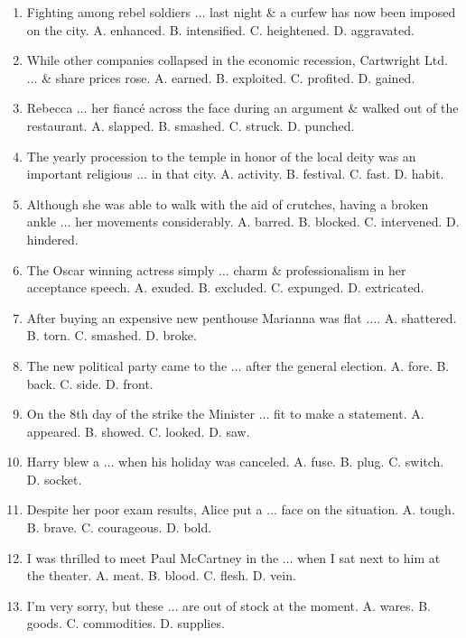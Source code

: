 \documentclass{article}
\numberwithin{equation}{section}
\begin{document}
\begin{enumerate}[leftmargin=8mm]
	\item Fighting among rebel soldiers $\ldots$ last night \& a curfew has now been imposed on the city. {\sf A.} enhanced. {\sf B.} intensified. {\sf C.} heightened. {\sf D.} aggravated.
	\item While other companies collapsed in the economic recession, Cartwright Ltd. $\ldots$ \& share prices rose. {\sf A.} earned. {\sf B.} exploited. {\sf C.} profited. {\sf D.} gained.
	\item Rebecca $\ldots$ her fianc\'e across the face during an argument \& walked out of the restaurant. {\sf A.} slapped. {\sf B.} smashed. {\sf C.} struck. {\sf D.} punched.
	\item The yearly procession to the temple in honor of the local deity was an important religious $\ldots$ in that city. {\sf A.} activity. {\sf B.} festival. {\sf C.} fast. {\sf D.} habit.
	\item Although she was able to walk with the aid of crutches, having a broken ankle $\ldots$ her movements considerably. {\sf A.} barred. {\sf B.} blocked. {\sf C.} intervened. {\sf D.} hindered.
	\item The Oscar winning actress simply $\ldots$ charm \& professionalism in her acceptance speech. {\sf A.} exuded. {\sf B.} excluded. {\sf C.} expunged. {\sf D.} extricated.
	\item After buying an expensive new penthouse Marianna was flat $\ldots$. {\sf A.} shattered. {\sf B.} torn. {\sf C.} smashed. {\sf D.} broke.
	\item The new political party came to the $\ldots$ after the general election. {\sf A.} fore. {\sf B.} back. {\sf C.} side. {\sf D.} front.
	\item On  the 8th day of the strike the Minister $\ldots$ fit to make a statement. {\sf A.} appeared. {\sf B.} showed. {\sf C.} looked. {\sf D.} saw.
	\item Harry blew a $\ldots$ when his holiday was canceled. {\sf A.} fuse. {\sf B.} plug. {\sf C.} switch. {\sf D.} socket.
	\item Despite her poor exam results, Alice put a $\ldots$ face on the situation. {\sf A.} tough. {\sf B.} brave. {\sf C.} courageous. {\sf D.} bold.
	\item I was thrilled to meet Paul McCartney in the $\ldots$ when I sat next to him at the theater. {\sf A.} meat. {\sf B.} blood. {\sf C.} flesh. {\sf D.} vein.
	\item I'm very sorry, but these $\ldots$ are out of stock at the moment. {\sf A.} wares. {\sf B.} goods. {\sf C.} commodities. {\sf D.} supplies.

\end{enumerate}
\end{document}
